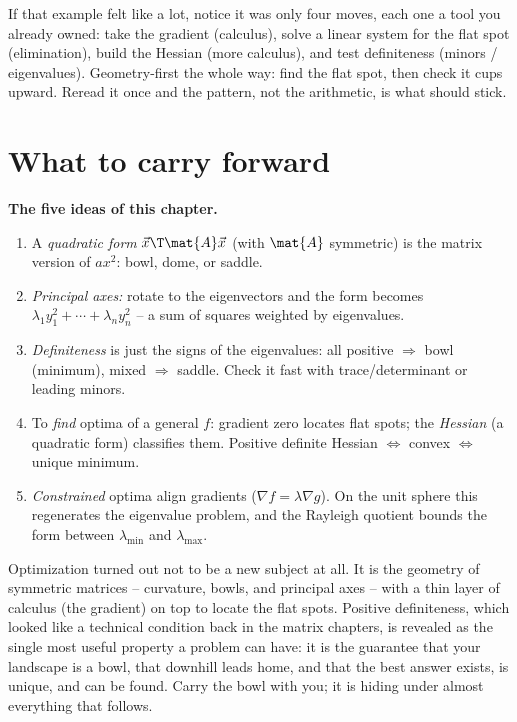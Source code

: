 \begin{recoverybox}
If that example felt like a lot, notice it was only four moves, each one a tool you
already owned: take the gradient (calculus), solve a linear system for the flat spot
(elimination), build the Hessian (more calculus), and test definiteness (minors /
eigenvalues). Geometry-first the whole way: find the flat spot, then check it cups
upward. Reread it once and the pattern, not the arithmetic, is what should stick.
\end{recoverybox}

\section{What to carry forward}
\label{ch36:summary}

\begin{focusbox}
\textbf{The five ideas of this chapter.}
\begin{enumerate}
\item A \emph{quadratic form} $\vec{x}\T\mat{A}\vec{x}$ (with $\mat{A}$ symmetric) is
the matrix version of $ax^2$: bowl, dome, or saddle.
\item \emph{Principal axes:} rotate to the eigenvectors and the form becomes
$\lambda_1 y_1^2+\cdots+\lambda_n y_n^2$ -- a sum of squares weighted by eigenvalues.
\item \emph{Definiteness} is just the signs of the eigenvalues: all positive
$\Rightarrow$ bowl (minimum), mixed $\Rightarrow$ saddle. Check it fast with
trace/determinant or leading minors.
\item To \emph{find} optima of a general $f$: gradient zero locates flat spots; the
\emph{Hessian} (a quadratic form) classifies them. Positive definite Hessian
$\Leftrightarrow$ convex $\Leftrightarrow$ unique minimum.
\item \emph{Constrained} optima align gradients ($\nabla f=\lambda\nabla g$). On the
unit sphere this regenerates the eigenvalue problem, and the Rayleigh quotient bounds
the form between $\lambda_{\min}$ and $\lambda_{\max}$.
\end{enumerate}
\end{focusbox}

Optimization turned out not to be a new subject at all. It is the geometry of
symmetric matrices -- curvature, bowls, and principal axes -- with a thin layer of
calculus (the gradient) on top to locate the flat spots. Positive definiteness, which
looked like a technical condition back in the matrix chapters, is revealed as the
single most useful property a problem can have: it is the guarantee that your
landscape is a bowl, that downhill leads home, and that the best answer exists, is
unique, and can be found. Carry the bowl with you; it is hiding under almost
everything that follows.

